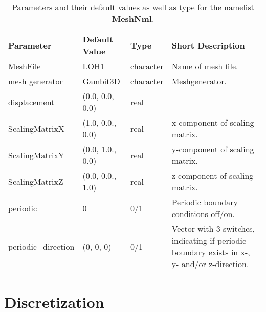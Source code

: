 \documentclass[12pt,twoside]{article}
\begin{document}
\begin{table}[H]
\caption{Parameters and their default values as well as type for the namelist \textbf{MeshNml}.}
\begin{center}
\begin{tabular}{|p{4cm}|p{2.7cm}|p{2cm}|p{4cm}|}
\hline
Parameter & Default Value & Type & Short Description \\
\hline
\hline
 MeshFile & LOH1 & character & Name of mesh file.\\
mesh generator & Gambit3D & character & Meshgenerator. \\
displacement & (0.0, 0.0, 0.0) & real & \\
ScalingMatrixX & (1.0, 0.0., 0.0) & real & x-component of scaling matrix. \\
ScalingMatrixY & (0.0, 1.0., 0.0) & real & y-component of scaling matrix. \\
ScalingMatrixZ & (0.0, 0.0., 1.0) & real & z-component of scaling matrix. \\
periodic & 0 & 0/1 & Periodic boundary conditions off/on.\\
periodic\_direction & (0, 0, 0) & 0/1 & Vector with 3 switches, indicating if periodic boundary exists in x-, y- and/or z-direction.\\
\hline
\end{tabular}
\end{center}
\label{mesh-table}
\end{table}

\newpage 

\section{Discretization}
\label{sec-block-dis}
\end{document}
